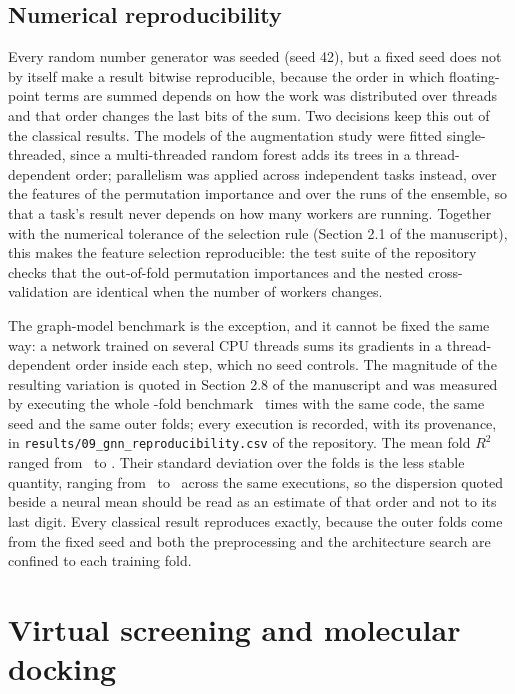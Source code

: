 \documentclass[a4paper,11pt]{article}
\begin{document}
\subsection*{Numerical reproducibility}

Every random number generator was seeded (seed 42), but a fixed seed does not by itself make a result bitwise
reproducible, because the order in which floating-point terms are summed depends on how the work was distributed over
threads and that order changes the last bits of the sum. Two decisions keep this out of the classical results. The
models of the augmentation study were fitted single-threaded, since a multi-threaded random forest adds its trees in a
thread-dependent order; parallelism was applied across independent tasks instead, over the features of the permutation
importance and over the runs of the ensemble, so that a task's result never depends on how many workers are running.
Together with the numerical tolerance of the selection rule (Section 2.1 of the manuscript),
this makes the feature selection reproducible: the test suite of the repository checks that the out-of-fold permutation
importances and the nested cross-validation are identical when the number of workers changes.

The graph-model benchmark is the exception, and it cannot be fixed the same way: a network trained on several CPU
threads sums its gradients in a thread-dependent order inside each step, which no seed controls. The magnitude of the
resulting variation is quoted in Section 2.8 of the manuscript and was measured by
executing the whole \TotalOuterFolds-fold benchmark \GnnRepeatNRuns\ times with the same code, the same seed and the
same outer folds; every execution is recorded, with its provenance, in \texttt{results/09\_gnn\_reproducibility.csv} of
the repository. The mean fold $R^2$ ranged from \GnnRepeatRTwoMin\ to \GnnRepeatRTwoMax. Their standard deviation over
the folds is the less stable quantity, ranging from \GnnRepeatStdMin\ to \GnnRepeatStdMax\ across the same executions,
so the dispersion quoted beside a neural mean should be read as an estimate of that order and not to its last digit.
Every classical result reproduces exactly, because the outer folds come from the fixed seed and both the preprocessing
and the architecture search are confined to each training fold.

\clearpage
\section*{Virtual screening and molecular docking}
\end{document}
